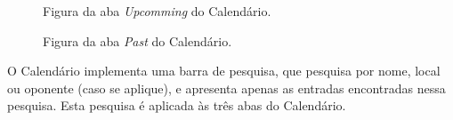 \begin{figure}[h]
	\begin{center}
	\end{center}
	\caption{Figura da aba \textit{Upcomming} do Calendário.}\label{fig:calendarupcomming}
\end{figure}

\begin{figure}[h]
	\begin{center}
	\end{center}
	\caption{Figura da aba \textit{Past} do Calendário.}\label{fig:calendarpast}
\end{figure}
\newpage

O Calendário implementa uma barra de pesquisa, que pesquisa por nome, local ou oponente (caso se aplique), e apresenta apenas as entradas encontradas nessa pesquisa. Esta pesquisa é aplicada às três abas do Calendário.

